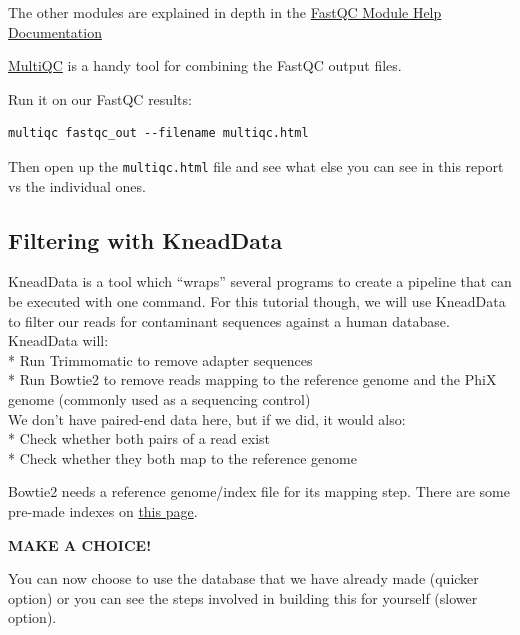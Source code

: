 \documentclass[
]{book}
\newenvironment{greenbox}{
  \definecolor{shadecolor}{RGB}{141, 181, 128}
  \color{white}
  \begin{shaded}}
 {\end{shaded}}
\begin{document}
The other modules are explained in depth in the \href{https://www.bioinformatics.babraham.ac.uk/projects/fastqc/Help/3\%20Analysis\%20Modules/}{FastQC Module Help Documentation}

\href{https://github.com/MultiQC/MultiQC}{MultiQC} is a handy tool for combining the FastQC output files.

Run it on our FastQC results:

\begin{verbatim}
multiqc fastqc_out --filename multiqc.html
\end{verbatim}

Then open up the \texttt{multiqc.html} file and see what else you can see in this report vs the individual ones.

\subsection{Filtering with KneadData}\label{filtering-with-kneaddata}

KneadData is a tool which ``wraps'' several programs to create a pipeline that can be executed with one command. For this tutorial though, we will use KneadData to filter our reads for contaminant sequences against a human database. KneadData will:\\
* Run Trimmomatic to remove adapter sequences\\
* Run Bowtie2 to remove reads mapping to the reference genome and the PhiX genome (commonly used as a sequencing control)\\

We don't have paired-end data here, but if we did, it would also:\\
* Check whether both pairs of a read exist\\
* Check whether they both map to the reference genome

Bowtie2 needs a reference genome/index file for its mapping step. There are some pre-made indexes on \href{https://benlangmead.github.io/aws-indexes/bowtie}{this page}.

\begin{greenbox}

\begin{center}
\textbf{MAKE A CHOICE!}

\end{center}

You can now choose to use the database that we have already made (quicker option) or you can see the steps involved in building this for yourself (slower option).

\end{greenbox}
\end{document}
